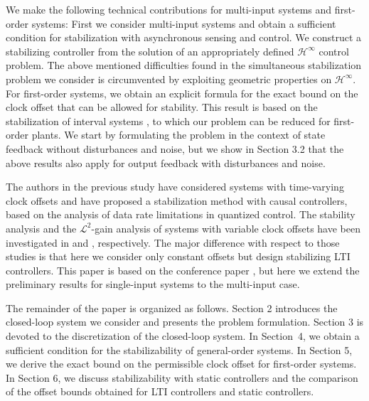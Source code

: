\documentclass[letterpaper, 12pt, draftcls, onecolumn]{ieeeconf}
\begin{document}
We make the following technical contributions for 
multi-input systems and first-order systems:
First we consider multi-input systems and 
obtain a sufficient condition for stabilization with asynchronous sensing and control.
We construct a stabilizing controller from
the solution of an appropriately defined  $\mathcal{H}^{\infty}$ control problem.
The above mentioned difficulties found in 
the simultaneous stabilization problem we consider 
is circumvented by exploiting geometric properties on $\mathcal{H}^{\infty}$.
For first-order systems,
we obtain
an explicit formula for the exact bound 
on the clock offset that can be allowed for stability.
This result is based on the stabilization of
interval systems \cite{Ghosh1988, Olbrot1994}, 
to which our problem can be reduced for first-order plants.
We start by formulating the problem in the context of state feedback without
disturbances and noise, but we show in Section 3.2 that
the above results also apply for output feedback with disturbances and 
noise.






The authors in the previous study \cite{Okano2015}
have considered systems with time-varying clock offsets
and have
proposed a stabilization method with causal controllers, 
based on the analysis of data rate limitations in quantized control.
The stability analysis and the $\mathcal{L}^2$-gain analysis of systems with variable 
clock offsets have been investigated in \cite{WakaikiCDC2015} and
\cite{Wakaiki2016ACC}, respectively. 
The major difference with respect to those studies is that
here we consider only constant offsets but
design stabilizing LTI controllers. 
This paper is based on the conference paper \cite{Wakaiki2015ACC}, but
here we extend the preliminary results for single-input systems to
the multi-input case.



The remainder of the paper is organized as follows.
Section 2 introduces the closed-loop system we consider 
and presents the problem formulation.
Section 3 is devoted to the discretization of the closed-loop system.
In Section~4, we obtain
a sufficient condition for the stabilizability
of general-order systems.
In Section 5,
we derive the exact bound
on the permissible clock offset for first-order systems. 
In Section 6, we discuss
stabilizability with static controllers and
the comparison of 
the offset bounds obtained for LTI controllers 
and static controllers.
\end{document}
